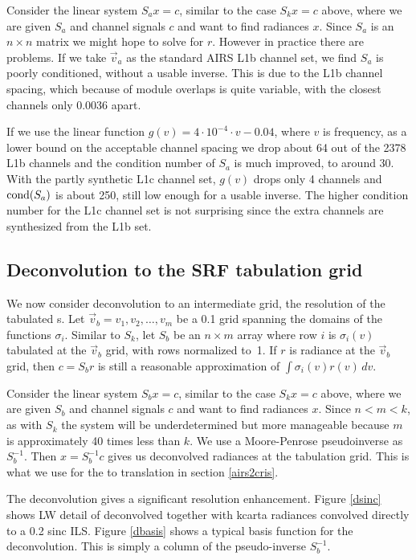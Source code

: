\documentclass[12pt]{article}
\begin{document}
Consider the linear system $S_a x = c$, similar to the case 
$S_k x = c$ above, where we are given $S_a$ and channel signals $c$
and want to find radiances $x$.  Since $S_a$ is an $n \times n$
matrix we might hope to solve for $r$.  However in practice there
are problems.  If we take $\vec v_a$ as the standard AIRS L1b
channel set, we find $S_a$ is poorly conditioned, without a usable
inverse.  This is due to the L1b channel spacing, which because of
module overlaps is quite variable, with the closest channels only
0.0036 {\wn} apart.

If we use the linear function $g(v) = 4\cdot 10^{-4} \cdot v -
0.04$, where $v$ is frequency, as a lower bound on the acceptable
channel spacing we drop about 64 out of the 2378 L1b channels and
the condition number of $S_a$ is much improved, to around 30.  With
the partly synthetic L1c channel set, $g(v)$ drops only 4 channels
and $\hbox{cond}(S_a)$ is about 250, still low enough for a usable
inverse.  The higher condition number for the L1c channel set is not
surprising since the extra channels are synthesized from the L1b
set.

\subsection{Deconvolution to the SRF tabulation grid}

We now consider deconvolution to an intermediate grid, the
resolution of the tabulated {\airs} {\srf}s.  Let $\vec v_b =
v_1,v_2,\ldots,v_m$ be a 0.1 {\wn} grid spanning the domains of the
functions $\sigma_i$.  Similar to $S_k$, let $S_b$ be an $n\times m$
array where row $i$ is $\sigma_i(v)$ tabulated at the $\vec v_b$
grid, with rows normalized to~1.  If $r$ is radiance at the $\vec
v_b$ grid, then $c = S_b r$ is still a reasonable approximation of
$\int\sigma_i(v)r(v)\,dv$.

Consider the linear system $S_b x = c$, similar to the case 
$S_k x = c$ above, where we are given $S_b$ and channel signals $c$
and want to find radiances $x$.  Since $n < m < k$, as with $S_k$
the system will be underdetermined but more manageable because $m$
is approximately 40 times less than $k$.  We use a Moore-Penrose
pseudoinverse as $S_b^{-1}$.  Then $x = S_b^{-1} c$ gives us
deconvolved radiances at the {\srf} tabulation grid.  This is what
we use for the {\airs} to {\cris} translation in section
\ref{airs2cris}.

The {\airs} deconvolution gives a significant resolution
enhancement.  Figure \ref{dsinc} shows LW detail of deconvolved
{\airs} together with kcarta radiances convolved directly to a 0.2
{\wn} sinc ILS.  Figure \ref{dbasis} shows a typical basis function
for the {\airs} deconvolution.  This is simply a column of the
pseudo-inverse $S_b^{-1}$.
\end{document}
